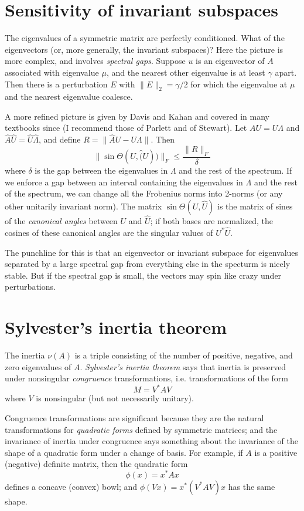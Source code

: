 \documentclass[12pt, leqno]{article} %
\begin{document}
\section{Sensitivity of invariant subspaces}

The eigenvalues of a symmetric matrix are perfectly conditioned.  What
of the eigenvectors (or, more generally, the invariant subspaces)?
Here the picture is more complex, and involves {\em spectral gaps}.
Suppose $u$ is an eigenvector of $A$ associated with eigenvalue $\mu$,
and the nearest other eigenvalue is at least $\gamma$ apart.  Then
there is a perturbation $E$ with $\|E\|_2 = \gamma/2$ for which the
eigenvalue at $\mu$ and the nearest eigenvalue coalesce.

A more refined picture is given by Davis and Kahan and covered in many
textbooks since (I recommend those of Parlett and of Stewart).  Let
$AU = U\Lambda$ and $\hat{A} \hat{U} = \hat{U} \hat{\Lambda}$,
and define $R = \|\hat{A} U-U \Lambda\|$.  Then
\[
  \|\sin \Theta(U,\hat(U))\|_F \leq \frac{\|R\|_F}{\delta}
\]
where $\delta$ is the gap between the eigenvalues in $\Lambda$
and the rest of the spectrum.  If we enforce a gap between an interval
containing the eigenvalues in $\Lambda$ and the rest of the spectrum,
we can change all the Frobenius norms into 2-norms (or any other
unitarily invariant norm).  The matrix $\sin \Theta(U,\hat{U})$ is
the matrix of sines of the {\em canonical angles} between $U$ and $\hat{U}$;
if both bases are normalized, the cosines of these canonical angles are
the singular values of $U^* \hat{U}$.

The punchline for this is that an eigenvector or invariant subspace
for eigenvalues separated by a large spectral gap from everything
else in the specturm is nicely stable.  But if the spectral gap is small,
the vectors may spin like crazy under perturbations.

\section{Sylvester's inertia theorem}

The inertia $\nu(A)$ is a triple consisting of the number of positive,
negative, and zero eigenvalues of $A$.  {\em Sylvester's inertia
  theorem} says that inertia is preserved under nonsingular {\em
  congruence} transformations, i.e. transformations of the form
\[
  M = V^* A V
\]
where $V$ is nonsingular (but not necessarily unitary).

Congruence transformations are significant because they are the natural
transformations for {\em quadratic forms} defined by symmetric matrices;
and the invariance of inertia under congruence says something about the
invariance of the shape of a quadratic form under a change of basis.
For example, if $A$ is a positive (negative) definite matrix, then the
quadratic form
\[
  \phi(x) = x^* A x
\]
defines a concave (convex) bowl; and $\phi(Vx) = x^* (V^* A V) x$ has
the same shape.
\end{document}
